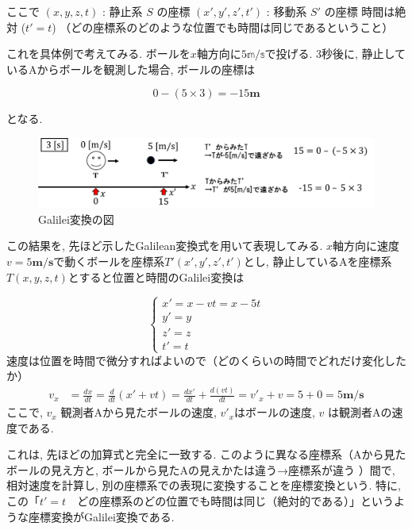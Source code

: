 \documentclass{ltjsarticle}
\begin{document}
ここで
\((x, y, z, t)\) : 静止系 \(S\) の座標
\((x', y', z', t')\) : 移動系 \(S'\) の座標  
時間は絶対 (\(t' = t\))  （どの座標系のどのような位置でも時間は同じであるということ）

これを具体例で考えてみる. 
ボールを$x$軸方向に$5\mathbb{m/s}$で投げる. 
3秒後に, 静止しているAからボールを観測した場合, ボールの座標は

\begin{equation}
0 - (5 \times 3)= -15\mathbf{m}
\end{equation}

となる. 

\begin{figure}[htbp]
  \centering
  \includegraphics[width=1\textwidth]{img/Galilei変換.png}
  \caption{Galilei変換の図}
\end{figure}

この結果を, 先ほど示したGalilean変換式を用いて表現してみる. 
$x$軸方向に速度$v = 5\mathbf{m/s}$で動くボールを座標系$T'(x', y', z', t')$とし, 静止しているAを座標系$T(x, y, z, t)$とすると位置と時間のGalilei変換は

\begin{equation}
\begin{cases}
x' = x - vt = x - 5 t \\
y' = y \\
z' = z \\
t' = t
\end{cases}
\end{equation}
速度は位置を時間で微分すればよいので（どのくらいの時間でどれだけ変化したか）
\begin{equation}
\begin{aligned}
v_x &= \frac{dx}{dt} = \frac{d}{dt}(x' + v t) = \frac{dx'}{dt} + \frac{d(vt)}{dt} = v'_x + v = 5 + 0 = 5\mathbf{m/s}
\end{aligned}
\end{equation}
ここで, $v_x$ 観測者Aから見たボールの速度, $v'_x$はボールの速度, $v$ は観測者Aの速度である. 

これは, 先ほどの加算式と完全に一致する. 
このように異なる座標系（Aから見たボールの見え方と, ボールから見たAの見えかたは違う→座標系が違う ）間で, 
相対速度を計算し, 別の座標系での表現に変換することを座標変換という. 
特に, この「$t' = t$　どの座標系のどの位置でも時間は同じ（絶対的である）」というような座標変換がGalilei変換である. 
\end{document}
